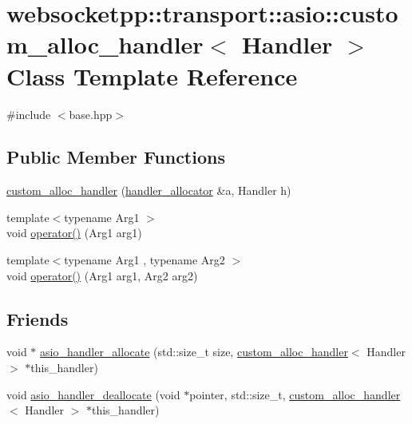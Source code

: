 \hypertarget{classwebsocketpp_1_1transport_1_1asio_1_1custom__alloc__handler}{}\section{websocketpp\+:\+:transport\+:\+:asio\+:\+:custom\+\_\+alloc\+\_\+handler$<$ Handler $>$ Class Template Reference}
\label{classwebsocketpp_1_1transport_1_1asio_1_1custom__alloc__handler}


{\ttfamily \#include $<$base.\+hpp$>$}

\subsection*{Public Member Functions}
\begin{DoxyCompactItemize}
\item 
\hyperlink{classwebsocketpp_1_1transport_1_1asio_1_1custom__alloc__handler_ab1006c6d3c3016696dd52d7127ec7a98}{custom\+\_\+alloc\+\_\+handler} (\hyperlink{classwebsocketpp_1_1transport_1_1asio_1_1handler__allocator}{handler\+\_\+allocator} \&a, Handler h)
\item 
{\footnotesize template$<$typename Arg1 $>$ }\\void \hyperlink{classwebsocketpp_1_1transport_1_1asio_1_1custom__alloc__handler_af90b97d3323ff192385dae0eb29b8d0d}{operator()} (Arg1 arg1)
\item 
{\footnotesize template$<$typename Arg1 , typename Arg2 $>$ }\\void \hyperlink{classwebsocketpp_1_1transport_1_1asio_1_1custom__alloc__handler_a79f7e6c87d8f40890740ff4c8aa560c5}{operator()} (Arg1 arg1, Arg2 arg2)
\end{DoxyCompactItemize}
\subsection*{Friends}
\begin{DoxyCompactItemize}
\item 
void $\ast$ \hyperlink{classwebsocketpp_1_1transport_1_1asio_1_1custom__alloc__handler_a14dd8ffbfb3f9997911fd87b4b6e88d8}{asio\+\_\+handler\+\_\+allocate} (std\+::size\+\_\+t size, \hyperlink{classwebsocketpp_1_1transport_1_1asio_1_1custom__alloc__handler}{custom\+\_\+alloc\+\_\+handler}$<$ Handler $>$ $\ast$this\+\_\+handler)
\item 
void \hyperlink{classwebsocketpp_1_1transport_1_1asio_1_1custom__alloc__handler_a2157a4fc2f17712f09483a1b317dcf3f}{asio\+\_\+handler\+\_\+deallocate} (void $\ast$pointer, std\+::size\+\_\+t, \hyperlink{classwebsocketpp_1_1transport_1_1asio_1_1custom__alloc__handler}{custom\+\_\+alloc\+\_\+handler}$<$ Handler $>$ $\ast$this\+\_\+handler)
\end{DoxyCompactItemize}


